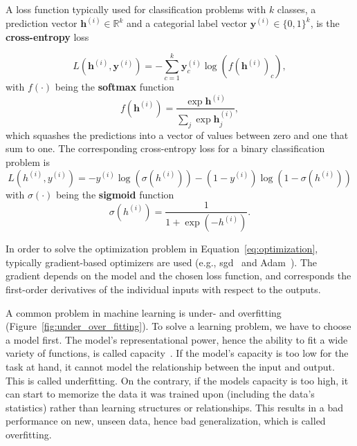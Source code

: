 A loss function typically used for classification problems with $k$ classes, a prediction vector $\mathbf{h}^{(i)} \in \mathbb{R}^k$ and a categorial label vector $\mathbf{y}^{(i)} \in \{0,1\}^{k}$, is the \textbf{cross-entropy} loss

\begin{equation}
    L(\mathbf{h}^{(i)}, \mathbf{y}^{(i)}) = -\sum_{c=1}^{k}\mathbf{y}_{c}^{(i)} \log(f(\mathbf{h}^{(i)})_c),
    \label{eq:cross_entropy_multi}
\end{equation}
with $f(\cdot)$ being the \textbf{softmax} function
\begin{equation}
   f(\mathbf{h}^{(i)}) = \frac{\exp\mathbf{h}^{(i)}}{\sum_{j} \exp{\mathbf{h}^{(i)}_{j}}},
   \label{eq:softmax}
\end{equation}
which squashes the predictions into a vector of values between zero and one that sum to one. The corresponding cross-entropy loss for a binary classification problem is
\begin{equation}
    L({h}^{(i)}, {y}^{(i)}) = -{y}^{(i)} \log(\sigma({h}^{(i)})) - (1- {y}^{(i)})\log(1- \sigma({h}^{(i)}))
    \label{eq:cross_entropy_binary}
\end{equation}
with $\sigma(\cdot)$ being the \textbf{sigmoid} function
\begin{equation}
   \sigma({h}^{(i)}) = \frac{1}{1 + \exp{(-{h}^{(i)})}}.
   \label{eq:sigmoid}
\end{equation}

In order to solve the optimization problem in Equation~\ref{eq:optimization}, typically gradient-based optimizers are used (e.g., \gls{sgd}~\cite{Goodfellow2016DeepLearning} and Adam~\cite{Kingma2014Adam:Optimization}). The gradient depends on the model and the chosen loss function, and corresponds the first-order derivatives of the individual inputs with respect to the outputs.

A common problem in machine learning is under- and overfitting (Figure~\ref{fig:under_over_fitting}). To solve a learning problem, we have to choose a model first. The model's representational power, hence the ability to fit a wide variety of functions, is called capacity~\cite{Goodfellow2016DeepLearning}. If the model's capacity is too low for the task at hand, it cannot model the relationship between the input and output. This is called underfitting. On the contrary, if the models capacity is too high, it can start to memorize the data it was trained upon (including the data's statistics) rather than learning structures or relationships. This results in a bad performance on new, unseen data, hence bad generalization, which is called overfitting.


